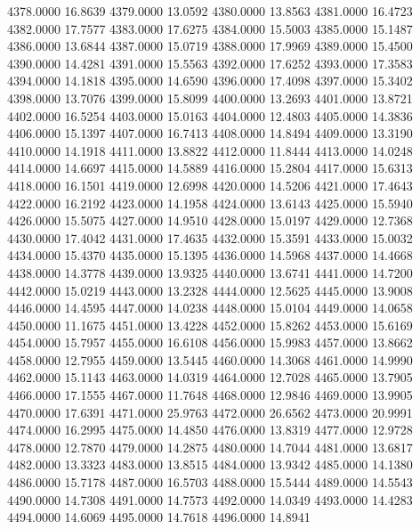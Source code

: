 4378.0000     16.8639
4379.0000     13.0592
4380.0000     13.8563
4381.0000     16.4723
4382.0000     17.7577
4383.0000     17.6275
4384.0000     15.5003
4385.0000     15.1487
4386.0000     13.6844
4387.0000     15.0719
4388.0000     17.9969
4389.0000     15.4500
4390.0000     14.4281
4391.0000     15.5563
4392.0000     17.6252
4393.0000     17.3583
4394.0000     14.1818
4395.0000     14.6590
4396.0000     17.4098
4397.0000     15.3402
4398.0000     13.7076
4399.0000     15.8099
4400.0000     13.2693
4401.0000     13.8721
4402.0000     16.5254
4403.0000     15.0163
4404.0000     12.4803
4405.0000     14.3836
4406.0000     15.1397
4407.0000     16.7413
4408.0000     14.8494
4409.0000     13.3190
4410.0000     14.1918
4411.0000     13.8822
4412.0000     11.8444
4413.0000     14.0248
4414.0000     14.6697
4415.0000     14.5889
4416.0000     15.2804
4417.0000     15.6313
4418.0000     16.1501
4419.0000     12.6998
4420.0000     14.5206
4421.0000     17.4643
4422.0000     16.2192
4423.0000     14.1958
4424.0000     13.6143
4425.0000     15.5940
4426.0000     15.5075
4427.0000     14.9510
4428.0000     15.0197
4429.0000     12.7368
4430.0000     17.4042
4431.0000     17.4635
4432.0000     15.3591
4433.0000     15.0032
4434.0000     15.4370
4435.0000     15.1395
4436.0000     14.5968
4437.0000     14.4668
4438.0000     14.3778
4439.0000     13.9325
4440.0000     13.6741
4441.0000     14.7200
4442.0000     15.0219
4443.0000     13.2328
4444.0000     12.5625
4445.0000     13.9008
4446.0000     14.4595
4447.0000     14.0238
4448.0000     15.0104
4449.0000     14.0658
4450.0000     11.1675
4451.0000     13.4228
4452.0000     15.8262
4453.0000     15.6169
4454.0000     15.7957
4455.0000     16.6108
4456.0000     15.9983
4457.0000     13.8662
4458.0000     12.7955
4459.0000     13.5445
4460.0000     14.3068
4461.0000     14.9990
4462.0000     15.1143
4463.0000     14.0319
4464.0000     12.7028
4465.0000     13.7905
4466.0000     17.1555
4467.0000     11.7648
4468.0000     12.9846
4469.0000     13.9905
4470.0000     17.6391
4471.0000     25.9763
4472.0000     26.6562
4473.0000     20.9991
4474.0000     16.2995
4475.0000     14.4850
4476.0000     13.8319
4477.0000     12.9728
4478.0000     12.7870
4479.0000     14.2875
4480.0000     14.7044
4481.0000     13.6817
4482.0000     13.3323
4483.0000     13.8515
4484.0000     13.9342
4485.0000     14.1380
4486.0000     15.7178
4487.0000     16.5703
4488.0000     15.5444
4489.0000     14.5543
4490.0000     14.7308
4491.0000     14.7573
4492.0000     14.0349
4493.0000     14.4283
4494.0000     14.6069
4495.0000     14.7618
4496.0000     14.8941
